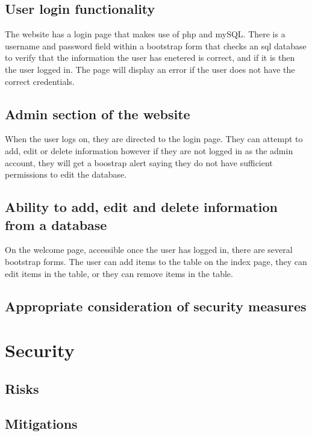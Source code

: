 \documentclass[12pt,a4paper]{article}
\begin{document}
		\subsection{User login functionality}
		The website has a login page that makes use of php and mySQL. There is a username and password field within a bootstrap form that checks an sql database to verify that the information the user has enetered is correct, and if it is then the user logged in. The page will display an error if the user does not have the correct credentials.

		\subsection{Admin section of the website}
		When the user logs on, they are directed to the login page. They can attempt to add, edit or delete information however if they are not logged in as the admin account, they will get a boostrap alert saying they do not have sufficient permissions to edit the database.

		\subsection{Ability to add, edit and delete information from a database}
		On the welcome page, accessible once the user has logged in, there are several bootstrap forms. The user can add items to the table on the index page, they can edit items in the table, or they can remove items in the table.

		\subsection{Appropriate consideration of security measures}

	\clearpage


	\section{Security}
		\subsection{Risks}

		\subsection{Mitigations}


	\clearpage






\end{document}
